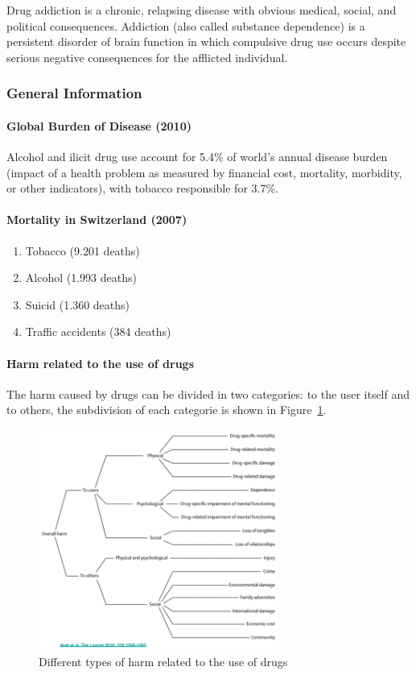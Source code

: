 \documentclass[12pt,article,oneside,a4paper]{memoir}
\begin{document}
Drug addiction is a chronic, relapsing disease with obvious medical, social,
and political consequences. Addiction (also called substance dependence) is a
persistent disorder of brain function in which compulsive drug use occurs
despite serious negative consequences for the afflicted individual.

\subsubsection{General Information}
\paragraph{Global Burden of Disease (2010)}
Alcohol and ilicit drug use account for 5.4\% of world's annual disease burden
(impact of a health problem as measured by financial cost, mortality, morbidity,
or other indicators), with tobacco responsible for 3.7\%.

\paragraph{Mortality in Switzerland (2007)} 
\begin{enumerate}
\item Tobacco (9.201 deaths)
\item Alcohol (1.993 deaths)
\item Suicid (1.360 deaths)
\item Traffic accidents (384 deaths)
\end{enumerate}

\paragraph{Harm related to the use of drugs}
The harm caused by drugs can be divided in two categories: to the user itself
and to others, the subdivision of each categorie is shown in Figure~\ref{fig:harm-drugs}.

\begin{figure}
  \centering
  \includegraphics[width=0.7\textwidth]{imgs/harm-drugs.png}
  \caption{Different types of harm related to the use of drugs}
  \label{fig:harm-drugs}
\end{figure}
\end{document}
